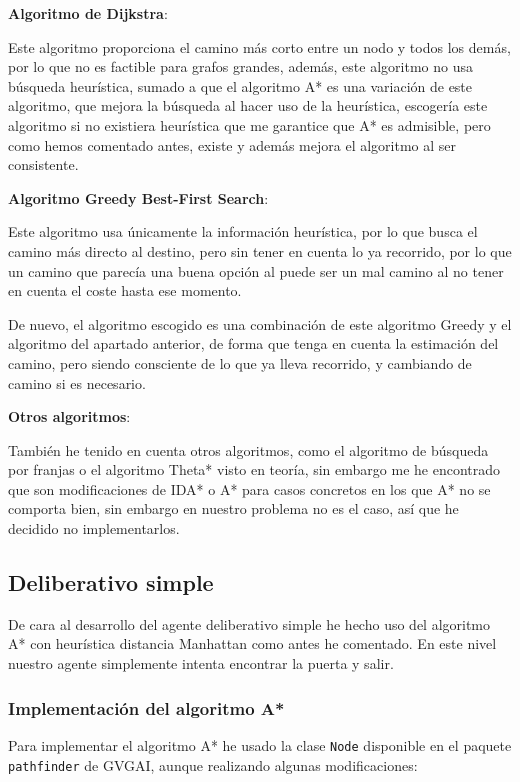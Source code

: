 \documentclass[10pt, spanish]{article}
\begin{document}
\textbf{Algoritmo de Dijkstra}:

Este algoritmo proporciona el camino más corto entre un nodo y todos los demás, por lo que no es factible para grafos grandes, además, este algoritmo no usa búsqueda heurística, sumado a que el algoritmo A* es una variación de este algoritmo, que mejora la búsqueda al hacer uso de la heurística, escogería este algoritmo si no existiera heurística que me garantice que A* es admisible, pero como hemos comentado antes, existe y además mejora el algoritmo al ser consistente.

\textbf{Algoritmo Greedy Best-First Search}:

Este algoritmo usa únicamente la información heurística, por lo que busca el camino más directo al destino, pero sin tener en cuenta lo ya recorrido, por lo que un camino que parecía una buena opción al puede ser un mal camino al no tener en cuenta el coste hasta ese momento.

De nuevo, el algoritmo escogido es una combinación de este algoritmo Greedy y el algoritmo del apartado anterior, de forma que tenga en cuenta la estimación del camino, pero siendo consciente de lo que ya lleva recorrido, y cambiando de camino si es necesario.


\textbf{Otros algoritmos}:

También he tenido en cuenta otros algoritmos, como el algoritmo de búsqueda por franjas o el algoritmo Theta* visto en teoría, sin embargo me he encontrado que son modificaciones de IDA* o A* para casos concretos en los que A* no se comporta bien, sin embargo en nuestro problema no es el caso, así que he decidido no implementarlos.

\subsection{Deliberativo simple}

De cara al desarrollo del agente deliberativo simple he hecho uso del algoritmo A* con heurística distancia Manhattan como antes he comentado. En este nivel nuestro agente simplemente intenta encontrar la puerta y salir.

\subsubsection{Implementación del algoritmo A*}

Para implementar el algoritmo A* he usado la clase \texttt{Node} disponible en el paquete \texttt{pathfinder} de GVGAI, aunque realizando algunas modificaciones:
\end{document}
